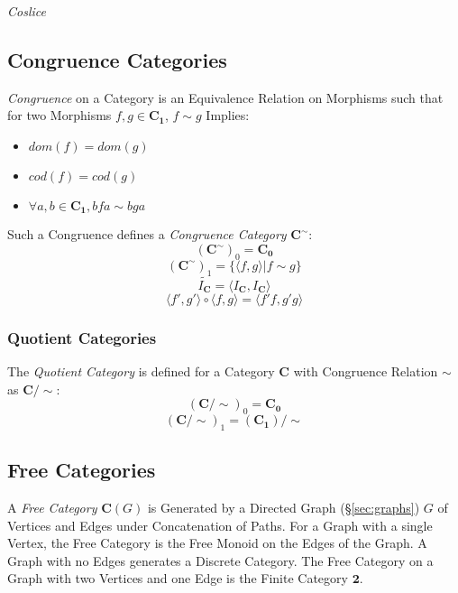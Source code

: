 \documentclass{article}
\begin{document}
\emph{Coslice}

\subsection{Congruence Categories}\label{subsec:category_congruence}

\emph{Congruence} on a Category is an Equivalence Relation on
Morphisms such that for two Morphisms $f,g \in \mathbf{C_1}$, $f \sim
g$ Implies:
\begin{itemize}
\item $dom(f) = dom(g)$
\item $cod(f) = cod(g)$
\item $\forall a,b \in \mathbf{C_1}, bfa \sim bga$
\end{itemize}
Such a Congruence defines a \emph{Congruence Category}
$\mathbf{C^{\sim}}$:
\[
    (\mathbf{C^{\sim}})_0 = \mathbf{C_0}
\]\[
    (\mathbf{C^{\sim}})_1 = \{\langle f,g \rangle | f \sim g\}
\]\[
    \tilde{I_\mathbf{C}} = \langle I_\mathbf{C}, I_\mathbf{C} \rangle
\]\[
    \langle f',g' \rangle \circ \langle f,g \rangle = \langle f'f,g'g \rangle
\]

\subsubsection{Quotient Categories}\label{subsec:category_quotient}

The \emph{Quotient Category} is defined for a Category $\mathbf{C}$
with Congruence Relation $\sim$ as $\mathbf{C}/\sim$:
\[
    (\mathbf{C}/\sim)_0 = \mathbf{C_0}
\]\[
    (\mathbf{C}/\sim)_1 = (\mathbf{C_1})/\sim
\]

\subsection{Free Categories}\label{subsec:free_categories}

A \emph{Free Category} $\mathbf{C}(G)$ is Generated by a Directed
Graph (\S\ref{sec:graphs}) $G$ of Vertices and Edges under
Concatenation of Paths. For a Graph with a single Vertex, the Free
Category is the Free Monoid on the Edges of the Graph. A Graph with no
Edges generates a Discrete Category. The Free Category on a Graph with
two Vertices and one Edge is the Finite Category $\mathbf{2}$.
\end{document}
